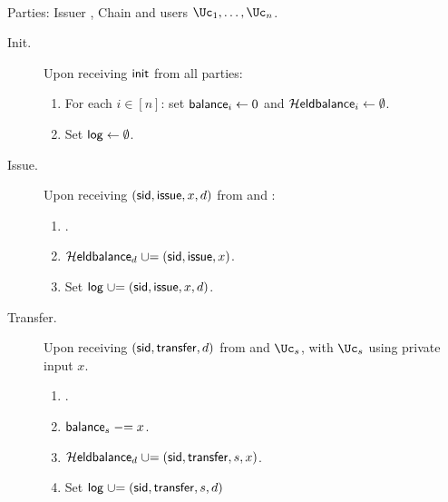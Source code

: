 \begin{functionality}\label{func:ConfidentialTransactions}~
	
	\item[Parties:]	Issuer \Ic, Chain \Cc and users  $\Uc_1, \ldots,\Uc_n$.
	
	\begin{description}
		\item[Init.] Upon receiving $\mathsf{init}$ from  all parties: 
		\begin{enumerate}
			\item  For each $i\in [n]$: set $\mathsf{balance}_i \leftarrow 0$ and $\mathcal{H}\mathsf{eldbalance}_i \leftarrow \emptyset$.
			
			\item Set $\mathsf{log} \leftarrow \emptyset$.
		\end{enumerate}
		
			\item[Issue.]   Upon receiving $(\mathsf{sid},\mathsf{issue},x,d)$ from  \Cc and \Ic:
		\begin{enumerate}
			
			
			\item {}.
			
			\item $\mathcal{H}\mathsf{eldbalance}_d \mathrel{\cup}= { (\mathsf{sid},\mathsf{issue},x)}$.
			
			\item Set $\mathsf{log} \mathrel{\cup}= {(\mathsf{sid},\mathsf{issue},x,d)}$.
		\end{enumerate}
		
		
		\item[Transfer.]    Upon receiving  $(\mathsf{sid},\mathsf{transfer},d)$ from  \Cc and  $\Uc_s$, with  $\Uc_s$ using private input $x$. 
		
	
		\begin{enumerate}
			\item {}.
			
			\item $\mathsf{balance}_s \mathrel{-}= x$.
			
			\item   $\mathcal{H}\mathsf{eldbalance}_d \mathrel{\cup}= (\mathsf{sid},\mathsf{transfer},s,x)$.
			
			\item Set $\mathsf{log} \mathrel{\cup}= {(\mathsf{sid},\mathsf{transfer},s,d)}$
			

\end{enumerate}
\end{description}
\end{functionality}
